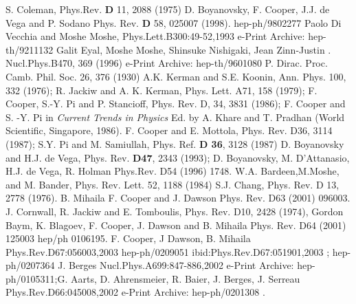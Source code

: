 \documentclass[a4paper,prd,preprint,superscriptaddress,showpacs,byrevtex]{revtex4}
\begin{document}
\begin{thebibliography}{9}

 S. Coleman, Phys.Rev. {\bf D} 11, 2088 (1975)
 D. Boyanovsky, F. Cooper, J.J. de Vega and P.
Sodano Phys. Rev. {\bf D} 58, 025007 (1998).  hep-ph/9802277
 Paolo Di Vecchia  and Moshe Moshe, Phys.Lett.B300:49-52,1993 
e-Print Archive: hep-th/9211132
 Galit
Eyal,
Moshe Moshe, Shinsuke Nishigaki, Jean Zinn-Justin .  Nucl.Phys.B470, 369
(1996)  e-Print Archive: hep-th/9601080 
   P. Dirac. Proc. Camb. Phil. Soc. 26, 376 (1930)
  A.K. Kerman
and S.E. Koonin, Ann. Phys. 100, 332 (1976);  R. Jackiw and A. K. Kerman,  
Phys. Lett. A71, 158 (1979);
 F. Cooper, S.-Y. Pi and
P. Stancioff, Phys. Rev. D, 34,
3831 (1986); F. Cooper and S. -Y. Pi in {\em Current Trends in
Physics}
Ed. by A. Khare and T. Pradhan (World Scientific, Singapore, 1986).
 F. Cooper and E. Mottola,  Phys. Rev.  D36, 3114 (1987);
S.Y. Pi and M. Samiullah, Phys. Ref. {\bf D 36}, 3128 (1987)
 D. Boyanovsky and  H.J. de Vega,
Phys. Rev.  {\bf D47}, 2343 (1993);
 D. Boyanovsky, M. D'Attanasio, H.J. de Vega, R. Holman
Phys.Rev. D54 (1996) 1748.
 W.A.
Bardeen,M.Moshe, and M. Bander, Phys. Rev. Lett. 52,
1188 (1984)
 S.J. Chang, Phys. Rev. D 13, 2778 (1976).
 B. Mihaila F. Cooper and J. Dawson Phys. Rev. D63 (2001) 096003.
 J. Cornwall, R. Jackiw and E. Tomboulis, Phys. Rev. D10, 2428 (1974),
Gordon Baym, 
 K. Blagoev, F. Cooper, J. Dawson and B. Mihaila Phys. Rev. D64 (2001)
125003 hep/ph 0106195.
F. Cooper, J Dawson, B. Mihaila Phys.Rev.D67:056003,2003 	
hep-ph/0209051 ibid:Phys.Rev.D67:051901,2003 ; hep-ph/0207364
 J. Berges Nucl.Phys.A699:847-886,2002 
e-Print Archive: hep-ph/0105311;G. Aarts, D. Ahrensmeier, R.
Baier, J. Berges, J. Serreau Phys.Rev.D66:045008,2002 
e-Print Archive: hep-ph/0201308 .
\end{thebibliography}
\end{document}
